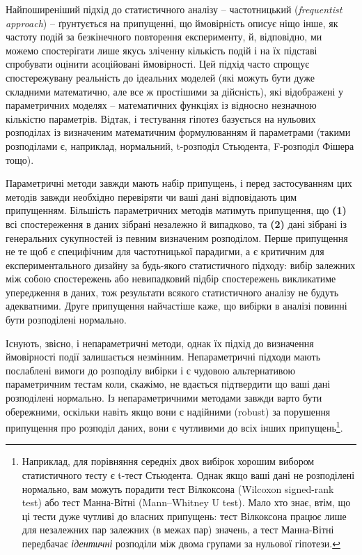 \documentclass[
  11pt,
]{book}
\begin{document}
Найпоширеніший підхід до статистичного аналізу -- частотницький (\emph{frequentist approach}) -- ґрунтується на припущенні, що ймовірність описує ніщо інше, як частоту подій за безкінечного повторення експерименту, й, відповідно, ми можемо спостерігати лише якусь зліченну кількість подій і на їх підставі спробувати оцінити асоційовані ймовірності. Цей підхід часто спрощує спостережувану реальність до ідеальних моделей (які можуть бути дуже складними математично, але все ж простішими за дійсність), які відображені у параметричних моделях -- математичних функціях із відносно незначною кількістю параметрів. Відтак, і тестування гіпотез базується на нульових розподілах із визначеним математичним формулюванням й параметрами (такими розподілами є, наприклад, нормальний, t-розподіл Стьюдента, F-розподіл Фішера тощо).

Параметричні методи завжди мають набір припущень, і перед застосуванням цих методів завжди необхідно перевіряти чи ваші дані відповідають цим припущенням. Більшість параметричних методів матимуть припущення, що \textbf{(1)} всі спостереження в даних зібрані незалежно й випадково, та \textbf{(2)} дані зібрані із генеральних сукупностей із певним визначеним розподілом. Перше припущення не те щоб є специфічним для частотницької парадигми, а є критичним для експериментального дизайну за будь-якого статистичного підходу: вибір залежних між собою спостережень або невипадковий підбір спостережень викликатиме упередження в даних, тож результати всякого статистичного аналізу не будуть адекватними. Друге припущення найчастіше каже, що вибірки в аналізі повинні бути розподілені нормально.

Існують, звісно, і непараметричні методи, однак їх підхід до визначення ймовірності події залишається незмінним. Непараметричні підходи мають послаблені вимоги до розподілу вибірки і є чудовою альтернативою параметричним тестам коли, скажімо, не вдається підтвердити що ваші дані розподілені нормально. Із непараметричними методами завжди варто бути обережними, оскільки навіть якщо вони є надійними (robust) за порушення припущення про розподіл даних, вони є чутливими до всіх інших припущень\footnote{Наприклад, для порівняння середніх двох вибірок хорошим вибором статистичного тесту є t-тест Стьюдента. Однак якщо ваші дані не розподілені нормально, вам можуть порадити тест Вілкоксона (Wilcoxon signed-rank test) або тест Манна-Вітні (Mann--Whitney U test). Мало хто знає, втім, що ці тести дуже чутливі до власних припущень: тест Вілкоксона працює лише для незалежних пар залежних (в межах пар) значень, а тест Манна-Вітні передбачає \emph{ідентичні} розподіли між двома групами за нульової гіпотези.}.
\end{document}
